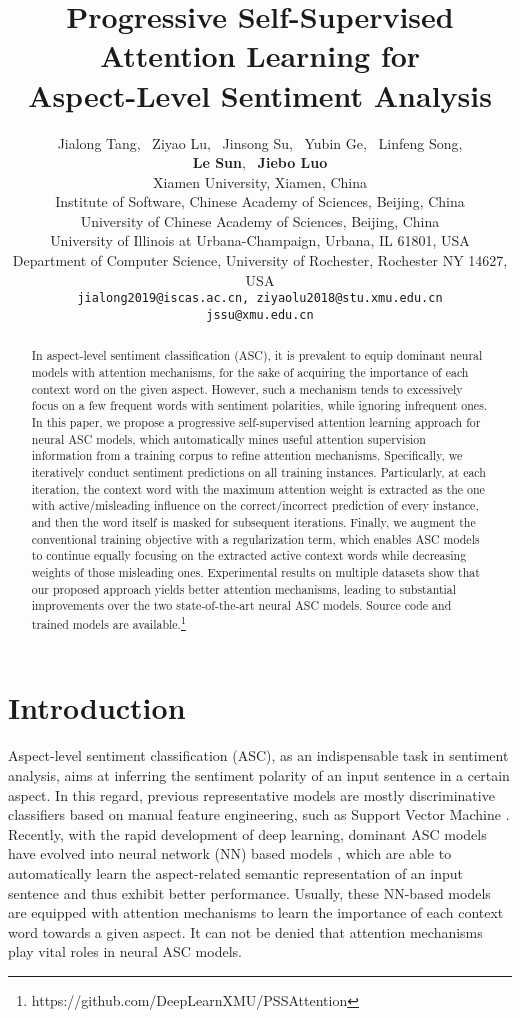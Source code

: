 \documentclass[11pt,a4paper]{article}
\title{Progressive Self-Supervised Attention Learning for \\ Aspect-Level Sentiment Analysis}
\author{Jialong Tang, \ Ziyao Lu, \  Jinsong Su, \
Yubin Ge, \ Linfeng Song, \\
\textbf{Le Sun}, \ \textbf{Jiebo Luo}\\
Xiamen University, Xiamen, China\\
Institute of Software, Chinese Academy of Sciences, Beijing, China\\
University of Chinese Academy of Sciences, Beijing, China\\
University of Illinois at Urbana-Champaign, Urbana, IL 61801, USA\\
Department of Computer Science, University of Rochester, Rochester NY 14627, USA\\
 {\tt jialong2019@iscas.ac.cn, ziyaolu2018@stu.xmu.edu.cn} \\
 {\tt jssu@xmu.edu.cn}
}
\date{}
\begin{document}
\maketitle
\begin{abstract}
{
\renewcommand{\thefootnote}{\fnsymbol{footnote}}
}
In aspect-level sentiment classification (ASC),
it is prevalent to equip dominant neural models with attention mechanisms,
for the sake of acquiring the importance of each context word on the given aspect.
However,
such a mechanism tends to excessively focus on a few frequent words with sentiment polarities,
while ignoring infrequent ones.
In this paper,
we propose a progressive self-supervised attention learning approach for neural ASC models,
which automatically mines useful attention supervision information from a training corpus to refine attention mechanisms.
Specifically,
we iteratively conduct sentiment predictions on all training instances.
Particularly,
at each iteration,
the context word with the maximum attention weight is extracted as the one with active/misleading influence on the correct/incorrect prediction of every instance,
and then the word itself is masked for subsequent iterations.
Finally,
we augment the conventional training objective with a regularization term,
which enables ASC models to continue equally focusing on the extracted active context words
while decreasing weights of those misleading ones.
Experimental results on multiple datasets show that our proposed approach yields better attention mechanisms,
leading to substantial improvements over the two state-of-the-art neural ASC models.
Source code and trained models are available.\footnote[1]{https://github.com/DeepLearnXMU/PSSAttention} 
\end{abstract}




\section{Introduction}
Aspect-level sentiment classification (ASC),
as an indispensable task in sentiment analysis,
aims at inferring the sentiment polarity of an input sentence in a certain aspect.
In this regard,
previous representative models are mostly discriminative classifiers
based on manual feature engineering,
such as Support Vector Machine \cite{Kiritchenko:SemEval2014,Wagner:SemEval2014}.
Recently,
with the rapid development of deep learning,
dominant ASC models have evolved into neural network (NN) based models \cite{Tang:EMNLP2016,Wang:EMNLP2016,Tang:COLING2016,Ma:IJCAI2017,Chen:EMNLP2017,Li:ACL2018,Wang:ACL2018},
which are able to automatically learn the aspect-related semantic representation of an input sentence
and thus exhibit better performance.
Usually,
these NN-based models are equipped with attention mechanisms to learn the importance of each context word towards a given aspect.
It can not be denied that attention mechanisms play vital roles in
neural ASC models.
\end{document}
